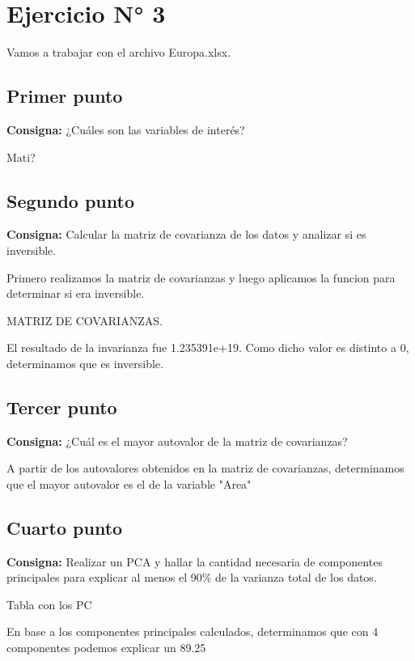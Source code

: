 \documentclass{article} %
\begin{document}
\section{Ejercicio N° 3}

Vamos a trabajar con el archivo Europa.xlsx.

\subsection{Primer punto}

\textbf{Consigna:} ¿Cuáles son las variables de interés?

Mati?

\subsection{Segundo punto}

\textbf{Consigna:} Calcular la matriz de covarianza de los datos y analizar si es inversible.

Primero realizamos la matriz de covarianzas y luego aplicamos la funcion para determinar si era inversible.

MATRIZ DE COVARIANZAS.

El resultado de la invarianza fue 1.235391e+19. Como dicho valor es distinto a 0, determinamos que es inversible.

\subsection{Tercer punto}

\textbf{Consigna:} ¿Cuál es el mayor autovalor de la matriz de covarianzas?

A partir de los autovalores obtenidos en la matriz de covarianzas, determinamos que el mayor autovalor es el de la variable "Area"

\subsection{Cuarto punto}

\textbf{Consigna:} Realizar un PCA y hallar la cantidad necesaria de componentes principales para explicar al menos el 90\% de la varianza total de los datos.

Tabla con los PC

En base a los componentes principales calculados, determinamos que con 4 componentes podemos explicar un 89.25%
\end{document}
